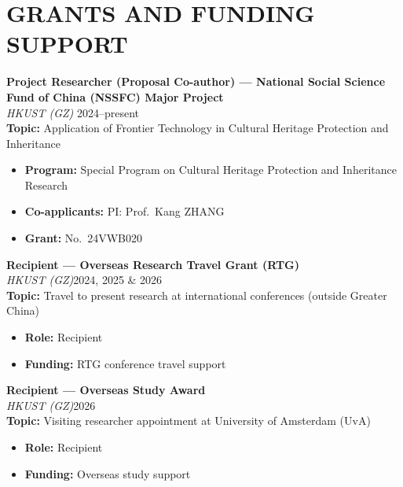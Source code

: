 \section*{GRANTS AND FUNDING SUPPORT}

\noindent \textbf{Project Researcher (Proposal Co-author) — National Social Science Fund of China (NSSFC) Major Project} \\
\textit{HKUST (GZ)} \hfill 2024--present\\
\textbf{Topic:} Application of Frontier Technology in Cultural Heritage Protection and Inheritance
\begin{itemize}[leftmargin=*]
  \item \textbf{Program:} Special Program on Cultural Heritage Protection and Inheritance Research
  \item \textbf{Co-applicants:} PI: Prof.~Kang ZHANG
  \item \textbf{Grant:} No.~24VWB020
\end{itemize}

\noindent\textbf{Recipient — Overseas Research Travel Grant (RTG)} \\
\textit{HKUST (GZ)}\hfill 2024, 2025 \& 2026\\
\textbf{Topic:} Travel to present research at international conferences (outside Greater China)
\begin{itemize}[leftmargin=*]
  \item \textbf{Role:} Recipient
  \item \textbf{Funding:} RTG conference travel support
\end{itemize}

\noindent\textbf{Recipient — Overseas Study Award} \\
\textit{HKUST (GZ)}\hfill 2026\\
\textbf{Topic:} Visiting researcher appointment at University of Amsterdam (UvA)
\begin{itemize}[leftmargin=*]
  \item \textbf{Role:} Recipient
  \item \textbf{Funding:} Overseas study support
\end{itemize}
